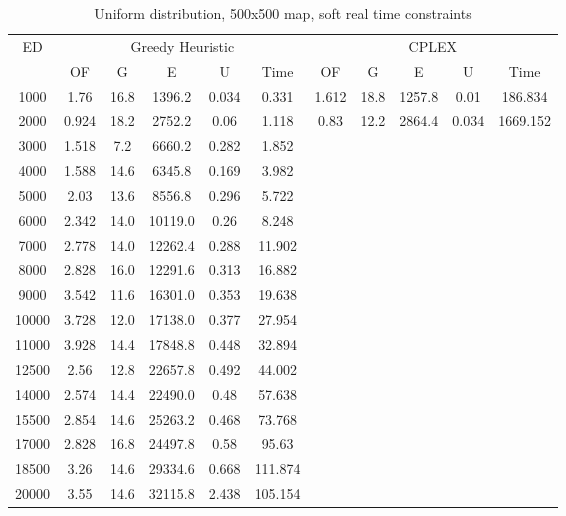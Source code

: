 \begin{table}[htb]
	\centering
	\begin{tabular}{|c|c|c|c|c|c|c|c|c|c|c|}
		\hline
		\multirow{2}{*}{ED} & \multicolumn{5}{c|}{Greedy Heuristic} & \multicolumn{5}{c|}{CPLEX}\\ 
		\cline{2-11}
& OF & G & E & U & Time & OF & G & E & U & Time\\ 
		\hline
		1000 & 1.76 & 16.8 & 1396.2 & 0.034 & 0.331 & 1.612 & 18.8 & 1257.8 & 0.01 & 186.834 \\ 
		2000 & 0.924 & 18.2 & 2752.2 & 0.06 & 1.118 & 0.83 & 12.2 & 2864.4 & 0.034 & 1669.152 \\ 
		3000 & 1.518 & 7.2 & 6660.2 & 0.282 & 1.852 & & & & &  \\ 
		4000 & 1.588 & 14.6 & 6345.8 & 0.169 & 3.982 & & & & &  \\ 
		5000 & 2.03 & 13.6 & 8556.8 & 0.296 & 5.722 & & & & &  \\ 
		6000 & 2.342 & 14.0 & 10119.0 & 0.26 & 8.248 & & & & &  \\ 
		7000 & 2.778 & 14.0 & 12262.4 & 0.288 & 11.902 & & & & &  \\ 
		8000 & 2.828 & 16.0 & 12291.6 & 0.313 & 16.882 & & & & &  \\ 
		9000 & 3.542 & 11.6 & 16301.0 & 0.353 & 19.638 & & & & &  \\ 
		10000 & 3.728 & 12.0 & 17138.0 & 0.377 & 27.954 & & & & &  \\ 
		11000 & 3.928 & 14.4 & 17848.8 & 0.448 & 32.894 & & & & &  \\ 
		12500 & 2.56 & 12.8 & 22657.8 & 0.492 & 44.002 & & & & &  \\ 
		14000 & 2.574 & 14.4 & 22490.0 & 0.48 & 57.638 & & & & &  \\ 
		15500 & 2.854 & 14.6 & 25263.2 & 0.468 & 73.768 & & & & &  \\ 
		17000 & 2.828 & 16.8 & 24497.8 & 0.58 & 95.63 & & & & &  \\ 
		18500 & 3.26 & 14.6 & 29334.6 & 0.668 & 111.874 & & & & &  \\ 
		20000 & 3.55 & 14.6 & 32115.8 & 2.438 & 105.154 & & & & &  \\ 
		\hline 
	\end{tabular} 
	\caption{Uniform distribution, 500x500 map, soft real time constraints} 
	\label{tab:unif_soft_n_esc_500} 
\end{table} 

